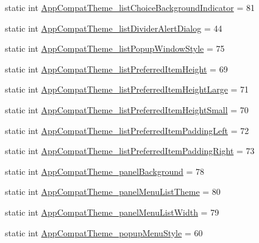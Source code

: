 \begin{DoxyCompactItemize}
static int \hyperlink{classandroid_1_1support_1_1v7_1_1appcompat_1_1R_1_1styleable_a099705a7173bf4f42f97f179e7b70d69}{App\+Compat\+Theme\+\_\+list\+Choice\+Background\+Indicator} = 81
\item 
static int \hyperlink{classandroid_1_1support_1_1v7_1_1appcompat_1_1R_1_1styleable_a7a821c50df10592a0cbb6633ce4d89b2}{App\+Compat\+Theme\+\_\+list\+Divider\+Alert\+Dialog} = 44
\item 
static int \hyperlink{classandroid_1_1support_1_1v7_1_1appcompat_1_1R_1_1styleable_a4a1930d25bde9775ddf86760b943b027}{App\+Compat\+Theme\+\_\+list\+Popup\+Window\+Style} = 75
\item 
static int \hyperlink{classandroid_1_1support_1_1v7_1_1appcompat_1_1R_1_1styleable_a491ac1bac5d3e90d2488434571ab909e}{App\+Compat\+Theme\+\_\+list\+Preferred\+Item\+Height} = 69
\item 
static int \hyperlink{classandroid_1_1support_1_1v7_1_1appcompat_1_1R_1_1styleable_aeb22f3a67066dc3fc32649e2528521f9}{App\+Compat\+Theme\+\_\+list\+Preferred\+Item\+Height\+Large} = 71
\item 
static int \hyperlink{classandroid_1_1support_1_1v7_1_1appcompat_1_1R_1_1styleable_a9c44e92688d2917cbaa6860767dc5c7f}{App\+Compat\+Theme\+\_\+list\+Preferred\+Item\+Height\+Small} = 70
\item 
static int \hyperlink{classandroid_1_1support_1_1v7_1_1appcompat_1_1R_1_1styleable_a69a77a880e875071ddde0553b2220450}{App\+Compat\+Theme\+\_\+list\+Preferred\+Item\+Padding\+Left} = 72
\item 
static int \hyperlink{classandroid_1_1support_1_1v7_1_1appcompat_1_1R_1_1styleable_a233f7ce58f3391f99dd01b686899d077}{App\+Compat\+Theme\+\_\+list\+Preferred\+Item\+Padding\+Right} = 73
\item 
static int \hyperlink{classandroid_1_1support_1_1v7_1_1appcompat_1_1R_1_1styleable_aa555e7cf895108969bdf9dd9d68743be}{App\+Compat\+Theme\+\_\+panel\+Background} = 78
\item 
static int \hyperlink{classandroid_1_1support_1_1v7_1_1appcompat_1_1R_1_1styleable_abe4dcb478c5a3aa191bd3e7faf51f323}{App\+Compat\+Theme\+\_\+panel\+Menu\+List\+Theme} = 80
\item 
static int \hyperlink{classandroid_1_1support_1_1v7_1_1appcompat_1_1R_1_1styleable_a6f48a7a199f63c3e2f95ae393ff66aeb}{App\+Compat\+Theme\+\_\+panel\+Menu\+List\+Width} = 79
\item 
static int \hyperlink{classandroid_1_1support_1_1v7_1_1appcompat_1_1R_1_1styleable_a6b864691ad3dd51a0c728b5e6b9cc7f5}{App\+Compat\+Theme\+\_\+popup\+Menu\+Style} = 60

\end{DoxyCompactItemize}
